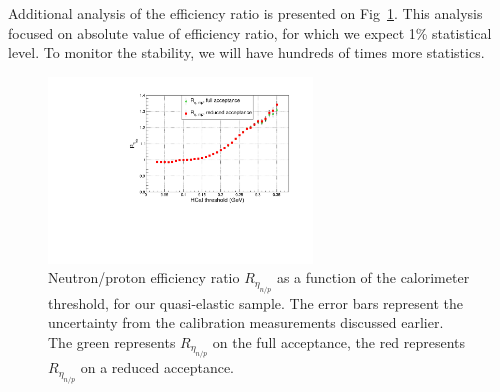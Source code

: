 Additional analysis of the efficiency ratio is presented on Fig~\ref{fig:Reta_np}.
This analysis focused on absolute value of efficiency ratio, for which we expect 1\% statistical level.
To monitor the stability, we will have hundreds of times more statistics.
%
\begin{figure}[!h]
  \centering
  \includegraphics[width=7cm]{Answers_Readers/Reta_np_fthr_errs.pdf}
  \caption{Neutron/proton efficiency ratio $R_{\eta_{n/p}}$ as a function of the calorimeter threshold, for our quasi-elastic sample. The error bars represent the uncertainty from the calibration measurements discussed earlier. The green represents $R_{\eta_{n/p}}$ on the full acceptance, the red represents $R_{\eta_{n/p}}$ on a reduced acceptance. %
            }
  \label{fig:Reta_np}
\end{figure}
%
